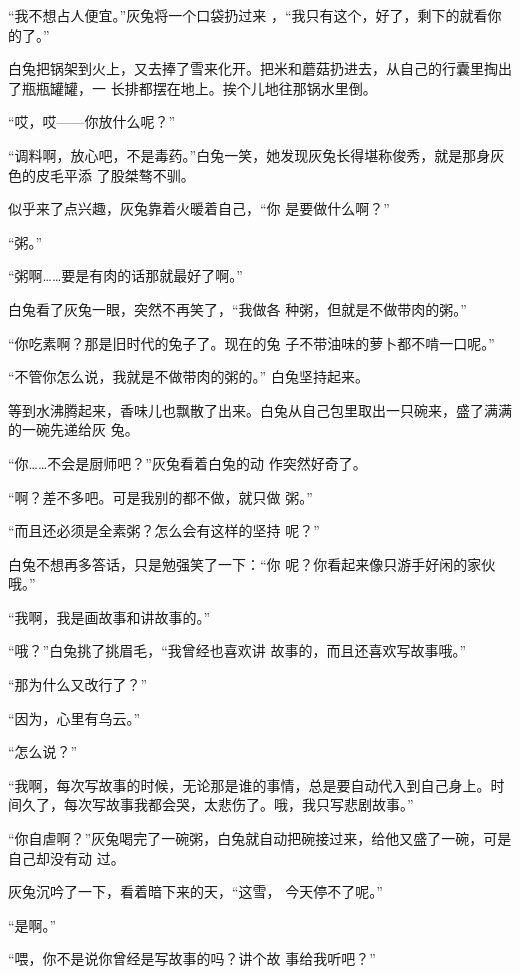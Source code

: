 \documentclass{article}
\begin{document}
“我不想占人便宜。”灰兔将一个口袋扔过来
，“我只有这个，好了，剩下的就看你的了。” 

白兔把锅架到火上，又去捧了雪来化开。把米和蘑菇扔进去，从自己的行囊里掏出了瓶瓶罐罐，一
长排都摆在地上。挨个儿地往那锅水里倒。 


“哎，哎——你放什么呢？” 

“调料啊，放心吧，不是毒药。”白兔一笑，她发现灰兔长得堪称俊秀，就是那身灰色的皮毛平添
了股桀骜不驯。 

似乎来了点兴趣，灰兔靠着火暖着自己，“你
是要做什么啊？” 


“粥。” 

\newpage


“粥啊……要是有肉的话那就最好了啊。” 

白兔看了灰兔一眼，突然不再笑了，“我做各
种粥，但就是不做带肉的粥。” 

“你吃素啊？那是旧时代的兔子了。现在的兔
子不带油味的萝卜都不啃一口呢。” 

“不管你怎么说，我就是不做带肉的粥的。”
白兔坚持起来。 

等到水沸腾起来，香味儿也飘散了出来。白兔从自己包里取出一只碗来，盛了满满的一碗先递给灰
兔。 

“你……不会是厨师吧？”灰兔看着白兔的动
作突然好奇了。 

“啊？差不多吧。可是我别的都不做，就只做
粥。” 

\newpage

“而且还必须是全素粥？怎么会有这样的坚持
呢？” 

白兔不想再多答话，只是勉强笑了一下：“你
呢？你看起来像只游手好闲的家伙哦。” 


“我啊，我是画故事和讲故事的。” 

“哦？”白兔挑了挑眉毛，“我曾经也喜欢讲
故事的，而且还喜欢写故事哦。” 


“那为什么又改行了？” 


“因为，心里有乌云。” 


“怎么说？” 

“我啊，每次写故事的时候，无论那是谁的事情，总是要自动代入到自己身上。时间久了，每次写故事我都会哭，太悲伤了。哦，我只写悲剧故事。”

\newpage

“你自虐啊？”灰兔喝完了一碗粥，白兔就自动把碗接过来，给他又盛了一碗，可是自己却没有动
过。 

灰兔沉吟了一下，看着暗下来的天，“这雪，
今天停不了呢。” 


“是啊。” 

“喂，你不是说你曾经是写故事的吗？讲个故
事给我听吧？” 
\end{document}
